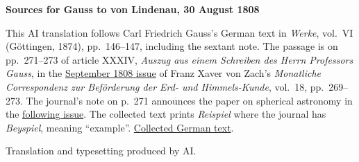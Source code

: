 \clearpage\thispagestyle{empty}
\begin{center}\textbf{Sources for Gauss to von Lindenau, 30 August 1808}\end{center}
\noindent This AI translation follows Carl Friedrich Gauss’s German text in \textit{Werke}, vol.~VI (Göttingen, 1874), pp.~146--147, including the sextant note. The passage is on pp.~271--273 of article XXXIV, \textit{Auszug aus einem Schreiben des Herrn Professors Gauss}, in the \href{https://www.digitale-sammlungen.de/en/view/bsb10538609?page=293}{September 1808 issue} of Franz Xaver von Zach’s \textit{Monatliche Correspondenz zur Beförderung der Erd- und Himmels-Kunde}, vol.~18, pp.~269--273. The journal’s note on p.~271 announces the paper on spherical astronomy in the \href{https://www.digitale-sammlungen.de/en/view/bsb10538609?page=299}{following issue}. The collected text prints \textit{Reispiel} where the journal has \textit{Beyspiel}, meaning “example”. \href{https://gdz.sub.uni-goettingen.de/id/PPN236007467}{Collected German text}.
\par\smallskip\noindent Translation and typesetting produced by AI.
\clearpage
